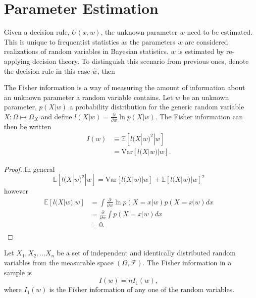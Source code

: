 \chapter{Parameter Estimation}
Given a decision rule, $U(x,w)$, the unknown parameter $w$ need to be estimated. This is unique to frequentist statistics as the parameters $w$ are considered realizations of random variables in Bayesian statistics. $w$ is estimated by re-applying decision theory. To distinguish this scenario from previous ones, denote the decision rule in this case $\hat{w}$, then


\begin{definition}
	\label{def:fisher_information}
	The Fisher information is a way of measuring the amount of information about an unknown parameter a random variable contains. Let $w$ be an unknown parameter, $p(X|w)$ a probability distribution for the generic random variable $X:\Omega\mapsto \Omega_X$ and define $l(X|w)= \frac{\partial}{\partial w} \ln p(X|w)$. The Fisher information can then be written
	\begin{equation}
		\begin{split}
			I(w) &\equiv \mathbb{E} [l(X|w)^2|w]\\
			&= \text{Var}[l(X|w)|w].
		\end{split}
	\end{equation}
\end{definition}

\begin{proof}
	In general 
	\begin{equation}
		\mathbb{E} [l(X|w)^2|w] = \text{Var}[l(X|w)|w]+\mathbb{E}[l(X|w)|w]^2
	\end{equation}
	however
	\begin{equation}
		\begin{split}
			\mathbb{E}[l(X|w)|w] &= \int  \frac{\partial}{\partial w} \ln p(X=x|w) p(X=x|w) dx\\
			&= \frac{\partial}{\partial w}\int  p(X=x|w) dx\\
			&= 0.\\
		\end{split}
	\end{equation}
\end{proof}


\begin{theorem}
	Let $X_1,X_2,\dots X_n$ be a set of independent and identically distributed random variables from the measurable space $(\Omega,\mathcal{F})$. The Fisher information in a sample is 
	\begin{equation}
		I(w) = nI_1(w),
	\end{equation}
	where $I_1(w)$ is the Fisher information of any one of the random variables.
\end{theorem}


